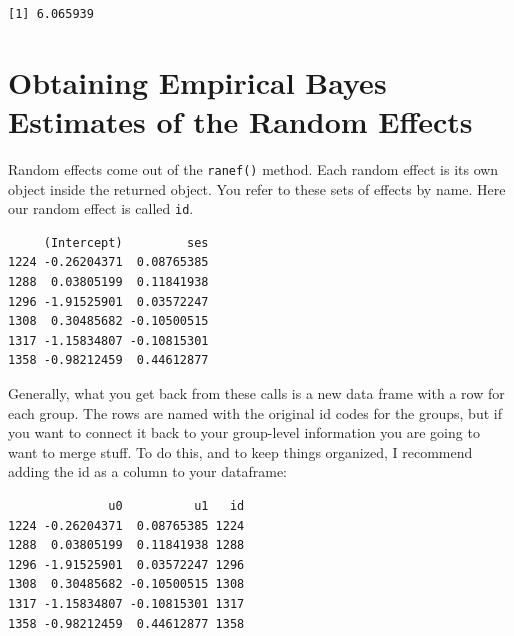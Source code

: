 \documentclass[
  letterpaper,
  DIV=11,
  numbers=noendperiod]{scrreprt}
\newenvironment{Shaded}{}{}
\newcommand{\FunctionTok}[1]{\textcolor[rgb]{0.02,0.16,0.49}{#1}}
\newcommand{\NormalTok}[1]{#1}
\newcommand{\OtherTok}[1]{\textcolor[rgb]{0.00,0.44,0.13}{#1}}
\newcommand{\SpecialCharTok}[1]{\textcolor[rgb]{0.25,0.44,0.63}{#1}}
\newcommand{\StringTok}[1]{\textcolor[rgb]{0.25,0.44,0.63}{#1}}
\begin{document}
\begin{verbatim}
[1] 6.065939
\end{verbatim}

\section{Obtaining Empirical Bayes Estimates of the Random
Effects}\label{obtaining-empirical-bayes-estimates-of-the-random-effects-1}

Random effects come out of the \texttt{ranef()} method. Each random
effect is its own object inside the returned object. You refer to these
sets of effects by name. Here our random effect is called \texttt{id}.

\begin{Shaded}
\end{Shaded}

\begin{verbatim}
     (Intercept)         ses
1224 -0.26204371  0.08765385
1288  0.03805199  0.11841938
1296 -1.91525901  0.03572247
1308  0.30485682 -0.10500515
1317 -1.15834807 -0.10815301
1358 -0.98212459  0.44612877
\end{verbatim}

Generally, what you get back from these calls is a new data frame with a
row for each group. The rows are named with the original id codes for
the groups, but if you want to connect it back to your group-level
information you are going to want to merge stuff. To do this, and to
keep things organized, I recommend adding the id as a column to your
dataframe:

\begin{Shaded}
\end{Shaded}

\begin{verbatim}
              u0          u1   id
1224 -0.26204371  0.08765385 1224
1288  0.03805199  0.11841938 1288
1296 -1.91525901  0.03572247 1296
1308  0.30485682 -0.10500515 1308
1317 -1.15834807 -0.10815301 1317
1358 -0.98212459  0.44612877 1358
\end{verbatim}
\end{document}
